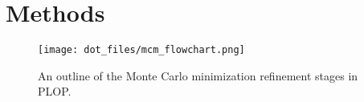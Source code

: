 \section{Methods}
\label{section:p450/methods}



\begin{figure}[h]
\centering
\texttt{[image: dot\_files/mcm\_flowchart.png]}
\caption{
An outline of the Monte Carlo minimization refinement stages in PLOP.
}
\label{fig:mcm_flowchart}
\end{figure}

